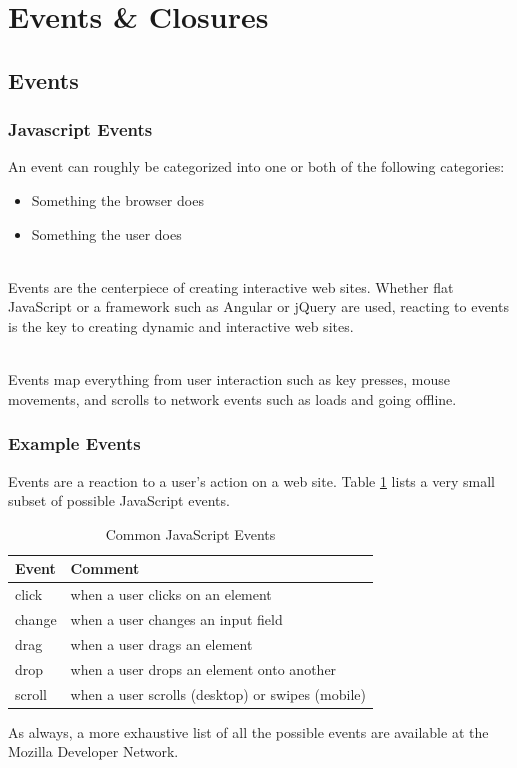 \documentclass[aspectratio=169]{beamer}
\begin{document}
\section{Events \& Closures}
\subsection{Events}
\begin{frame}
\frametitle{Javascript Events}
An event can roughly be categorized into one or both of the following categories:
\begin{itemize}
	\item Something the browser does
	\item Something the user does
\end{itemize}

\pause
\mbox{}\\
Events are the centerpiece of creating interactive web sites. Whether flat JavaScript or a framework such as Angular or jQuery are used, reacting to events is the key to creating dynamic and interactive web sites.

\pause
\mbox{}\\
Events map everything from user interaction such as key presses, mouse movements, and scrolls to network events such as loads and going offline.
\end{frame}

\begin{frame}
\frametitle{Example Events}
Events are a reaction to a user's action on a web site. Table \ref{tbl:events} lists a very small subset of possible JavaScript events.
\begin{table}
\begin{tabular}{|l|l|}
\hline
\textbf{Event} & \textbf{Comment}\\
\hline
click & when a user clicks on an element\\
\hline
change & when a user changes an input field\\
\hline
drag & when a user drags an element\\
\hline
drop & when a user drops an element onto another\\
\hline
scroll & when a user scrolls (desktop) or swipes (mobile)\\
\hline
\end{tabular}
\caption{Common JavaScript Events}
\label{tbl:events}
\end{table}

As always, a more exhaustive list of all the possible events are available at the Mozilla Developer Network. \cite{mdn} 
\end{frame}
\end{document}
